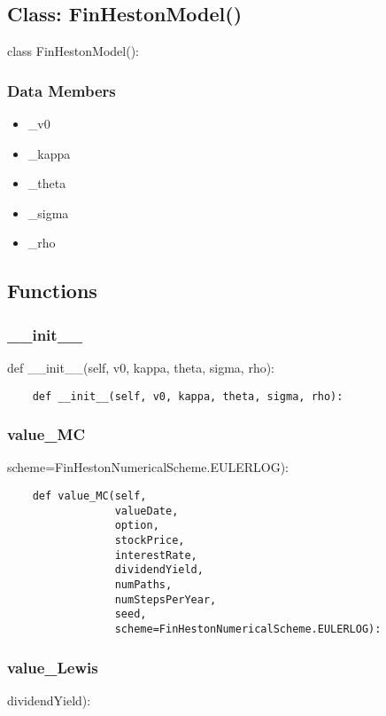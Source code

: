 \documentclass[twoside,11pt]{book}
\begin{document}
\subsection*{Class: FinHestonModel()}
class FinHestonModel(): 

\subsubsection*{Data Members}
\begin{itemize}
\item{\_v0}
\item{\_kappa}
\item{\_theta}
\item{\_sigma}
\item{\_rho}
\end{itemize}

\subsection*{Functions}

\subsubsection*{{\bf \_\_init\_\_}}
def \_\_init\_\_(self, v0, kappa, theta, sigma, rho): 

\begin{lstlisting}
    def __init__(self, v0, kappa, theta, sigma, rho):
\end{lstlisting}

\subsubsection*{{\bf value\_MC}}
scheme=FinHestonNumericalScheme.EULERLOG): 

\begin{lstlisting}
    def value_MC(self,
                 valueDate,
                 option,
                 stockPrice,
                 interestRate,
                 dividendYield,
                 numPaths,
                 numStepsPerYear,
                 seed,
                 scheme=FinHestonNumericalScheme.EULERLOG):
\end{lstlisting}

\subsubsection*{{\bf value\_Lewis}}
dividendYield): 
\end{document}
